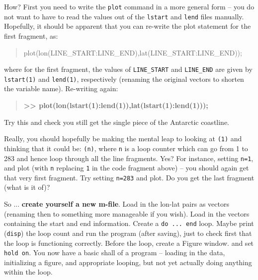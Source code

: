 \documentclass{tufte-book} %
\newenvironment{docspec}{\begin{quotation}\ttfamily\parskip0pt\parindent0pt\ignorespaces}{\end{quotation}}
\newenvironment{docspecbold}{\begin{quotation}\ttfamily\bfseries\parskip0pt\parindent0pt\ignorespaces}{\end{quotation}}
\begin{document}
How? First you need to write the \texttt{plot} command in a more general form -- you do not want to have to read the values out of the \texttt{lstart} and \texttt{lend} files manually. Hopefully, it should be apparent that you can re-write the plot statement for the first fragment, as:

\begin{docspec}
plot(lon(LINE\_START:LINE\_END),lat(LINE\_START:LINE\_END));
\end{docspec}

where for the first fragment, the values of \texttt{LINE\_START} and \texttt{LINE\_END} are given by \texttt{lstart(1)} and \texttt{lend(1)}, respectively (renaming the original vectors to shorten the variable name). Re-writing again:

\begin{docspecbold}
>> plot(lon(lstart(1):lend(1)),lat(lstart(1):lend(1)));
\end{docspecbold}

Try this and check you still get the single piece of the Antarctic coastline.

Really, you should hopefully be making the mental leap to looking at \texttt{(1)} and thinking that it could be: \texttt{(n)}, where \texttt{n} is a loop counter which can go from 1 to 283 and hence loop through all the line fragments. Yes? For instance, setting \texttt{n=1}, and plot (with \texttt{n} replacing \texttt{1} in the code fragment above) -- you should again get that very  first fragment. Try setting \texttt{n=283} and plot. Do you get the last fragment (what is it of)?

So ...\textbf{ create yourself a new m-file}. Load in the lon-lat pairs as vectors (renaming then to something more manageable if you wish). Load in the vectors containing the start and end information. Create a \texttt{do ... end} loop. Maybe print (\texttt{disp}) the loop count and run the program (after saving), just to check first that the loop is functioning correctly. Before the loop, create a \textsf{Figure window}. and set \texttt{hold on}. You now have a basic shall of a program -- loading in the data, initializing a figure, and appropriate looping, but not yet actually doing anything within the loop.
\end{document}
